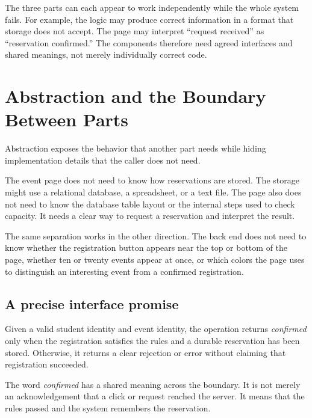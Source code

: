 \documentclass[11pt]{article}
\begin{document}
The three parts can each appear to work independently while the whole system fails. For example, the logic may produce correct information in a format that storage does not accept. The page may interpret ``request received'' as ``reservation confirmed.'' The components therefore need agreed interfaces and shared meanings, not merely individually correct code.

\section{Abstraction and the Boundary Between Parts}

\begin{definition}[Abstraction]
Abstraction exposes the behavior that another part needs while hiding implementation details that the caller does not need.
\end{definition}

The event page does not need to know how reservations are stored. The storage might use a relational database, a spreadsheet, or a text file. The page also does not need to know the database table layout or the internal steps used to check capacity. It needs a clear way to request a reservation and interpret the result.

The same separation works in the other direction. The back end does not need to know whether the registration button appears near the top or bottom of the page, whether ten or twenty events appear at once, or which colors the page uses to distinguish an interesting event from a confirmed registration.

\subsection{A precise interface promise}

\begin{keyidea}
Given a valid student identity and event identity, the operation returns \emph{confirmed} only when the registration satisfies the rules and a durable reservation has been stored. Otherwise, it returns a clear rejection or error without claiming that registration succeeded.
\end{keyidea}

The word \emph{confirmed} has a shared meaning across the boundary. It is not merely an acknowledgement that a click or request reached the server. It means that the rules passed and the system remembers the reservation.
\end{document}
